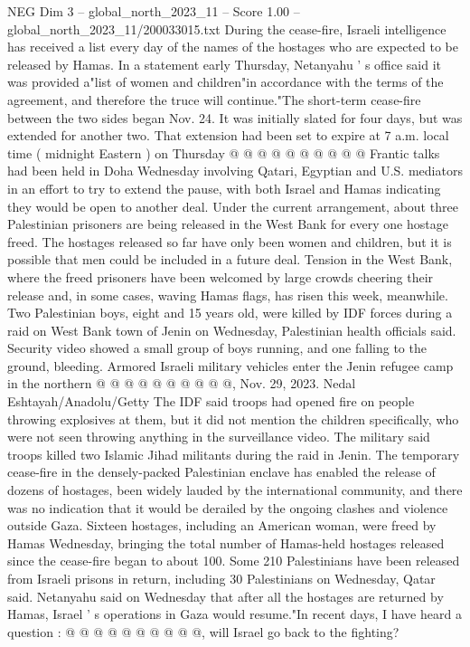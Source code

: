 \begin{textsample}{NEG Dim 3 – global\_north\_2023\_11 – Score 1.00 – global\_north\_2023\_11/200033015.txt}
During the cease-fire, Israeli intelligence has received a list every day of the names of the hostages who are expected to be released by Hamas.
In a statement early Thursday, Netanyahu ' s office said it was provided a"list of women and children"in accordance with the terms of the agreement, and therefore the truce will continue."The short-term cease-fire between the two sides began Nov. 24.
It was initially slated for four days, but was extended for another two.
That extension had been set to expire at 7 a.m. local time ( midnight Eastern ) on Thursday @ @ @ @ @ @ @ @ @ @ Frantic talks had been held in Doha Wednesday involving Qatari, Egyptian and U.S. mediators in an effort to try to extend the pause, with both Israel and Hamas indicating they would be open to another deal.
Under the current arrangement, about three Palestinian prisoners are being released in the West Bank for every one hostage freed.
The hostages released so far have only been women and children, but it is possible that men could be included in a future deal.
Tension in the West Bank, where the freed prisoners have been welcomed by large crowds cheering their release and, in some cases, waving Hamas flags, has risen this week, meanwhile.
Two Palestinian boys, eight and 15 years old, were killed by IDF forces during a raid on West Bank town of Jenin on Wednesday, Palestinian health officials said.
Security video showed a small group of boys running, and one falling to the ground, bleeding.
Armored Israeli military vehicles enter the Jenin refugee camp in the northern @ @ @ @ @ @ @ @ @ @, Nov. 29, 2023.
Nedal Eshtayah/Anadolu/Getty The IDF said troops had opened fire on people throwing explosives at them, but it did not mention the children specifically, who were not seen throwing anything in the surveillance video.
The military said troops killed two Islamic Jihad militants during the raid in Jenin.
The temporary cease-fire in the densely-packed Palestinian enclave has enabled the release of dozens of hostages, been widely lauded by the international community, and there was no indication that it would be derailed by the ongoing clashes and violence outside Gaza.
Sixteen hostages, including an American woman, were freed by Hamas Wednesday, bringing the total number of Hamas-held hostages released since the cease-fire began to about 100.
Some 210 Palestinians have been released from Israeli prisons in return, including 30 Palestinians on Wednesday, Qatar said.
Netanyahu said on Wednesday that after all the hostages are returned by Hamas, Israel ' s operations in Gaza would resume."In recent days, I have heard a question : @ @ @ @ @ @ @ @ @ @, will Israel go back to the fighting?

\end{textsample}
